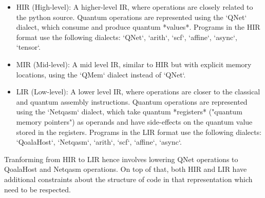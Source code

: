 \begin{itemize}
\item HIR (High-level): A higher-level IR, where operations are closely related
  to the python source.
  Quantum operations are represented using the `QNet` dialect, which consume and produce quantum *values*.
  Programs in the HIR format use the following dialects: `QNet`, `arith`, `scf`, `affine`, `async`, `tensor`.
\item MIR (Mid-level): A mid level IR, similar to HIR but with explicit memory locations, using the `QMem` dialect instead of `QNet`.
\item LIR (Low-level): A lower level IR, where operations are closer to the
  classical and quantum assembly instructions.
  Quantum operations are represented using the `Netqasm` dialect, which take quantum *registers* ("quantum memory pointers") as operands
  and have side-effects on the quantum value stored in the registers.
  Programs in the LIR format use the following dialects: `QoalaHost`, `Netqasm`, `arith`, `scf`, `affine`, `async`.
\end{itemize}

Tranforming from HIR to LIR hence involves lowering QNet operations to QoalaHost and Netqasm operations.
On top of that, both HIR and LIR have additional constraints about the structure of code in that representation which need to be respected.



